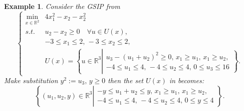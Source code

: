 \documentclass{amsart}
\theoremstyle{plain}
\newtheorem{exmp}[theorem]{Example}
\newcommand{\re}{\mathbb{R}}
\newcommand{\st}{\mathit{s.t.}}
\numberwithin{equation}{section}
\begin{document}
		
		\begin{exmp}\label{GlibP15} 
		Consider the GSIP from \cite{ruckmann2001second} 
			\[
			\left\{\begin{array}{ll}
				\min\limits_{x\in\re^2} & 4x_1^2-x_2-x_2^2\\
				\st & u_2-x_2\ge 0\quad \forall u\in U(x),\\
				& -3\le x_1\le 2,\, -3\le x_2\le 2,\\
				& U(x) = \left\{ u\in\re^3\left|\begin{array}{l}
					u_3-(u_1+u_2)^2\ge 0,\, x_1\ge u_1,\, x_1 \ge u_2,\\
					-4\le u_1\le 4,\, -4\le u_2\le 4,\, 0\le u_3\le 16
				\end{array}\right\}.
				\right.\end{array}
			\right.
			\]
			Make substitution $y^2:=u_3,\,y\geq 0$ then the set $U(x)$ in  becomes:
			\[	 \left\{ (u_1,u_2,y)\in\re^3\left|\begin{array}{l}
				-y\leq u_1+u_2\leq y,\, x_1\ge u_1,\, x_1 \ge u_2,\\
				-4\le u_1\le 4,\, -4\le u_2\le 4,\, 0\le y\le 4
			\end{array}\right\}.
			\right.
			\]
		\end{exmp}
		
		
		
		
		
		
		
\end{document}
